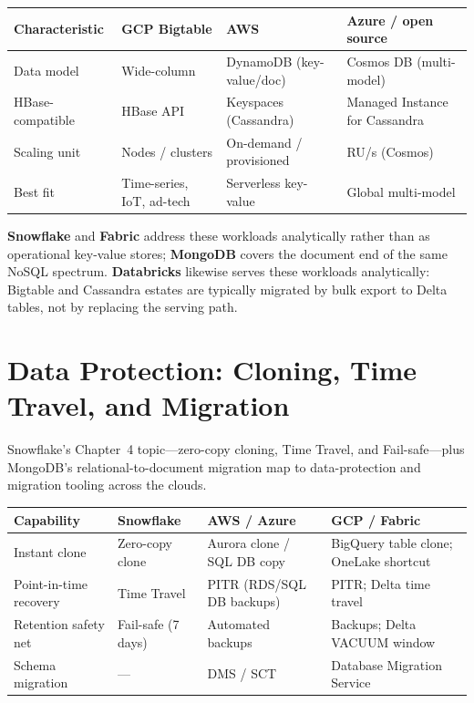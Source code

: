\begin{center}
\footnotesize
\begin{tabular}{@{}p{2.8cm}p{3.0cm}p{3.0cm}p{3.4cm}@{}}
\toprule
\textbf{Characteristic} & \textbf{GCP Bigtable} & \textbf{AWS} & \textbf{Azure / open source} \\
\midrule
Data model & Wide-column & DynamoDB (key-value/doc) & Cosmos DB (multi-model) \\
HBase-compatible & HBase API & Keyspaces (Cassandra) & Managed Instance for Cassandra \\
Scaling unit & Nodes / clusters & On-demand / provisioned & RU/s (Cosmos) \\
Best fit & Time-series, IoT, ad-tech & Serverless key-value & Global multi-model \\
\bottomrule
\end{tabular}
\end{center}

\noindent \textbf{Snowflake} and \textbf{Fabric} address these workloads analytically rather than as
operational key-value stores; \textbf{MongoDB} covers the document end of the same NoSQL spectrum.
\textbf{Databricks} likewise serves these workloads analytically: Bigtable and Cassandra estates
are typically migrated by bulk export to Delta tables, not by replacing the serving path.

\section{Data Protection: Cloning, Time Travel, and Migration}
%
Snowflake's Chapter~4 topic---zero-copy cloning, Time Travel, and Fail-safe---plus MongoDB's
relational-to-document migration map to data-protection and migration tooling across the clouds.

\begin{center}
\footnotesize
\begin{tabular}{@{}p{2.8cm}p{3.0cm}p{3.0cm}p{3.4cm}@{}}
\toprule
\textbf{Capability} & \textbf{Snowflake} & \textbf{AWS / Azure} & \textbf{GCP / Fabric} \\
\midrule
Instant clone & Zero-copy clone & Aurora clone / SQL DB copy & BigQuery table clone; OneLake shortcut \\
Point-in-time recovery & Time Travel & PITR (RDS/SQL DB backups) & PITR; Delta time travel \\
Retention safety net & Fail-safe (7 days) & Automated backups & Backups; Delta VACUUM window \\
Schema migration & --- & DMS / SCT & Database Migration Service \\
\bottomrule
\end{tabular}
\end{center}

